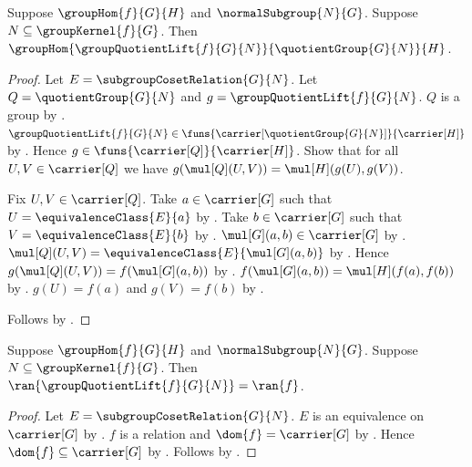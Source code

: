 \begin{theorem}\label{group_quotient_lift_hom}
    Suppose $\groupHom{f}{G}{H}$ and $\normalSubgroup{N}{G}$.
    Suppose $N\subseteq\groupKernel{f}{G}$.
    Then
        $\groupHom
            {\groupQuotientLift{f}{G}{N}}
            {\quotientGroup{G}{N}}{H}$.
\end{theorem}
\begin{proof}
    Let $E=\subgroupCosetRelation{G}{N}$.
    Let $Q=\quotientGroup{G}{N}$ and
        $g=\groupQuotientLift{f}{G}{N}$.
    $Q$ is a group by .
    $\groupQuotientLift{f}{G}{N}\in
        \funs{\carrier[\quotientGroup{G}{N}]}{\carrier[H]}$ by
        .
    Hence $g\in\funs{\carrier[Q]}{\carrier[H]}$.
    Show that for all $U,V\in\carrier[Q]$ we have
        $g(\mul[Q](U,V))=\mul[H](g(U),g(V))$.
    \begin{subproof}
        Fix $U,V\in\carrier[Q]$.
        Take $a\in\carrier[G]$ such that
            $U=\equivalenceClass{E}{a}$ by
            .
        Take $b\in\carrier[G]$ such that
            $V=\equivalenceClass{E}{b}$ by
            .
        $\mul[G](a,b)\in\carrier[G]$ by
            .
        $\mul[Q](U,V)=
            \equivalenceClass{E}{\mul[G](a,b)}$ by
            .
        Hence $g(\mul[Q](U,V))=f(\mul[G](a,b))$ by
            .
        $f(\mul[G](a,b))=\mul[H](f(a),f(b))$ by
            .
        $g(U)=f(a)$ and $g(V)=f(b)$ by
            .
    \end{subproof}
    Follows by .
\end{proof}

\begin{theorem}\label{group_quotient_lift_range}
    Suppose $\groupHom{f}{G}{H}$ and $\normalSubgroup{N}{G}$.
    Suppose $N\subseteq\groupKernel{f}{G}$.
    Then $\ran{\groupQuotientLift{f}{G}{N}}=\ran{f}$.
\end{theorem}
\begin{proof}
    Let $E=\subgroupCosetRelation{G}{N}$.
    $E$ is an equivalence on $\carrier[G]$ by
        .
    $f$ is a relation and $\dom{f}=\carrier[G]$ by
        .
    Hence $\dom{f}\subseteq\carrier[G]$ by .
    Follows by
        .
\end{proof}

